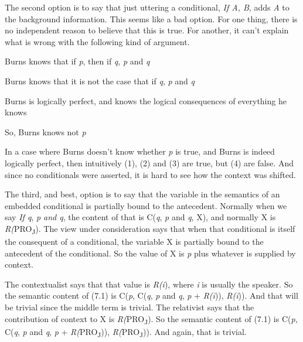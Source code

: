 The second option is to say that just uttering a conditional, \textit{If A, B}, adds \textit{A} to the background information. This seems like a bad option. For one thing, there is no independent reason to believe that this is true. For another, it can't explain what is wrong with the following kind of argument.

\renewcommand{\labelenumi}{(\arabic{enumi})}
\begin{enumerate*}
\setcounter{enumi}{0}
\item Burns knows that if \textit{p}, then if \textit{q}, \textit{p} and \textit{q}

\item Burns knows that it is not the case that if \textit{q}, \textit{p} and \textit{q}

\item Burns is logically perfect, and knows the logical consequences of everything he knows

\item So, Burns knows not \textit{p}
\end{enumerate*}

\noindent In a case where Burns doesn't know whether \textit{p} is true, and Burns is indeed logically perfect, then intuitively (1), (2) and (3) are true, but (4) are false. And since no conditionals were asserted, it is hard to see how the context was shifted.

The third, and best, option is to say that the variable in the semantics of an embedded conditional is partially bound to the antecedent. Normally when we say \textit{If q}, \textit{p and q}, the content of that is C(\textit{q}, \textit{p} and \textit{q}, X), and normally X is \textit{R(}PRO\textsubscript{J}). The view under consideration says that when that conditional is itself the consequent of a conditional, the variable X is partially bound to the antecedent of the conditional. So the value of X is \textit{p} plus whatever is supplied by context. 

The contextualist says that that value is \textit{R(i}), where \textit{i} is usually the speaker. So the semantic content of (7.1) is C(\textit{p}, C(\textit{q}, \textit{p} and \textit{q}, \textit{p} + \textit{R(i})), \textit{R(i})). And that will be trivial since the middle term is trivial. The relativist says that the contribution of context to X is \textit{R(}PRO\textsubscript{J}). So the semantic content of (7.1) is C(\textit{p}, C(\textit{q}, \textit{p} and \textit{q}, \textit{p} + \textit{R(}PRO\textsubscript{J})), \textit{R(}PRO\textsubscript{J})). And again, that is trivial.


